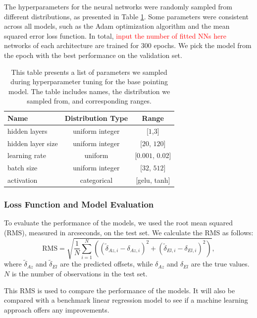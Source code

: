 The hyperparameters for the neural networks were randomly sampled from different distributions, as presented in Table \ref{tab:nn_hyperparameters}.
Some parameters were consistent across all models, such as the Adam optimization algorithm and the mean squared error loss function.
In total, \textcolor{red}{input the number of fitted NNs here} networks of each architecture are trained for $300$ epochs.
We pick the model from the epoch with the best performance on the validation set.
\begin{table}[H]
    \centering
    \caption{This table presents a list of parameters we sampled during hyperparameter tuning for the base pointing model. The table includes names, the distribution we sampled from, and corresponding ranges.}
    \begin{tabular}{lcc}
    \hline
    \textbf{Name} & \textbf{Distribution Type} & \textbf{Range} \\ \hline
    hidden layers & uniform integer & [$1$,$3$] \\
    hidden layer size & uniform integer & [$20$, $120$] \\
    learning rate & uniform & [$0.001$, $0.02$] \\
    batch size & uniform integer & [$32$, $512$] \\
    activation & categorical & [gelu, tanh] \\ \hline
    \end{tabular}
    \label{tab:nn_hyperparameters}
    \end{table}

\subsubsection{Loss Function and Model Evaluation}
To evaluate the performance of the models, we used the root mean squared (RMS), measured in arcseconds, on the test set.
We calculate the RMS as follows:
\begin{equation}
    \text{RMS} = \sqrt{ \frac{1}{N} \sum_{i=1}^N \left( (\tilde{\delta}_{Az,i} - \delta_{Az,i})^2 + (\tilde{\delta}_{El,i} - \delta_{El,i})^2 \right)},
\end{equation}
where $\tilde{\delta}_{Az}$ and $\tilde{\delta}_{El}$ are the predicted offsets, while $\delta_{Az}$ and $\delta_{El}$ are the true values.
$N$ is the number of observations in the test set.

This RMS is used to compare the performance of the models.
It will also be compared with a benchmark linear regression model to see if a machine learning approach offers any improvements.

